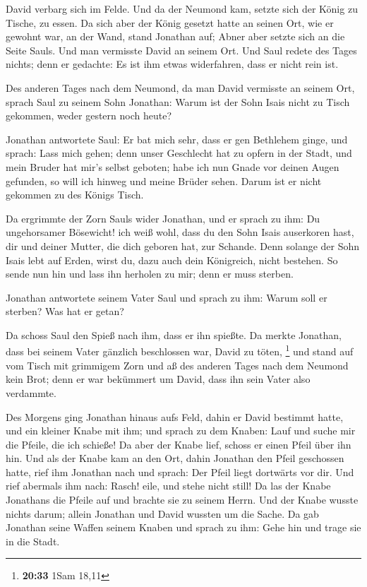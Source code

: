  David verbarg sich im Felde. Und da der Neumond kam,
setzte sich der König zu Tische, zu essen.  Da sich aber
der König gesetzt hatte an seinen Ort, wie er gewohnt war, an der Wand,
stand Jonathan auf; Abner aber setzte sich an die Seite Sauls. Und man
vermisste David an seinem Ort.  Und Saul redete des Tages
nichts; denn er gedachte: Es ist ihm etwas widerfahren, dass er nicht
rein ist.

 Des anderen Tages nach dem Neumond, da man David
vermisste an seinem Ort, sprach Saul zu seinem Sohn Jonathan: Warum ist
der Sohn Isais nicht zu Tisch gekommen, weder gestern noch heute?

 Jonathan antwortete Saul: Er bat mich sehr, dass er gen
Bethlehem ginge,  und sprach: Lass mich gehen; denn unser
Geschlecht hat zu opfern in der Stadt, und mein Bruder hat mir's selbst
geboten; habe ich nun Gnade vor deinen Augen gefunden, so will ich
hinweg und meine Brüder sehen. Darum ist er nicht gekommen zu des Königs
Tisch.

 Da ergrimmte der Zorn Sauls wider Jonathan, und er
sprach zu ihm: Du ungehorsamer Bösewicht! ich weiß wohl, dass du den
Sohn Isais auserkoren hast, dir und deiner Mutter, die dich geboren hat,
zur Schande.  Denn solange der Sohn Isais lebt auf Erden,
wirst du, dazu auch dein Königreich, nicht bestehen. So sende nun hin
und lass ihn herholen zu mir; denn er muss sterben.

 Jonathan antwortete seinem Vater Saul und sprach zu ihm:
Warum soll er sterben? Was hat er getan?

 Da schoss Saul den Spieß nach ihm, dass er ihn spießte.
Da merkte Jonathan, dass bei seinem Vater gänzlich beschlossen war,
David zu töten, \footnote{\textbf{20:33} 1Sam 18,11}  und
stand auf vom Tisch mit grimmigem Zorn und aß des anderen Tages nach dem
Neumond kein Brot; denn er war bekümmert um David, dass ihn sein Vater
also verdammte.

 Des Morgens ging Jonathan hinaus aufs Feld, dahin er
David bestimmt hatte, und ein kleiner Knabe mit ihm;  und
sprach zu dem Knaben: Lauf und suche mir die Pfeile, die ich schieße! Da
aber der Knabe lief, schoss er einen Pfeil über ihn hin. 
Und als der Knabe kam an den Ort, dahin Jonathan den Pfeil geschossen
hatte, rief ihm Jonathan nach und sprach: Der Pfeil liegt dortwärts vor
dir.  Und rief abermals ihm nach: Rasch! eile, und stehe
nicht still! Da las der Knabe Jonathans die Pfeile auf und brachte sie
zu seinem Herrn.  Und der Knabe wusste nichts darum;
allein Jonathan und David wussten um die Sache.  Da gab
Jonathan seine Waffen seinem Knaben und sprach zu ihm: Gehe hin und
trage sie in die Stadt.

